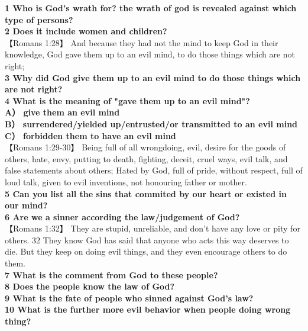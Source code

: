 \textbf{1 Who is God's wrath for? the wrath of god is revealed against which type of persons?}\\
\textbf{2 Does it include women and children?}\\

【Romans 1:28】 And because they had not the mind to keep God in their knowledge, God gave them up to an evil mind, to do those things which are not right;\\

\textbf{3 Why did God give them up to an evil mind to do those things which are not right?}\\
\textbf{4 What is the meaning of "gave them up to an evil mind"?}\\
\textbf{A） give them an evil mind\hspace{2cm}\\ B） surrendered/yielded up/entrusted/or transmitted to an evil mind\hspace{2cm}\\ C） forbidden them to have an evil mind}\\

【Romans 1:29-30】 Being full of all wrongdoing, evil, desire for the goods of others, hate, envy, putting to death, fighting, deceit, cruel ways, evil talk, and false statements about others;
Hated by God, full of pride, without respect, full of loud talk, given to evil inventions, not honouring father or mother.\\


\textbf{5 Can you list all the sins that commited by our heart or existed in our mind?}\\
\textbf{6 Are we a sinner according the law/judgement of God?}\\



【Romans 1:32】 They are stupid, unreliable, and don't have any love or pity for others. 32 They know God has said that anyone who acts this way deserves to die. But they keep on doing evil things, and they even encourage others to do them.\\

\textbf{7 What is the comment from God to these people?}\\
\textbf{8 Does the people know the law of God?}\\
\textbf{9 What is the fate of people who sinned against God's law?}\\
\textbf{10 What is the further more evil behavior when people doing wrong thing?}\\


